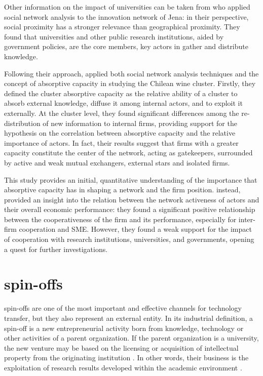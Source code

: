 Other information on the impact of universities can be taken from \citet{Cantner2006} who applied social network analysis to the innovation network of Jena: in their perspective, social proximity has a stronger relevance than geographical proximity. They found that universities and other public research institutions, aided by government policies, are the core members, key actors in gather and distribute knowledge.

Following their approach, \citet{Giuliani2005} applied both social network analysis techniques and the concept of absorptive capacity in studying the Chilean wine cluster. Firstly, they defined the cluster absorptive capacity as the relative ability of a cluster to absorb external knowledge, diffuse it among internal actors, and to exploit it externally. At the cluster level, they found significant differences among the re-distribution of new information to internal firms, providing support for the hypothesis on the correlation between absorptive capacity and the relative importance of actors. In fact, their results suggest that firms with a greater capacity constitute the center of the network, acting as gatekeepers, surrounded by active and weak mutual exchangers, external stars and isolated firms.

This study provides an initial, quantitative understanding of the importance that absorptive capacity has in shaping a network and the firm position. \citet{Zeng2010} instead, provided an insight into the relation between the network activeness of actors and their overall economic performance: they found a significant positive relationship between the cooperativeness of the firm and its performance, especially for inter-firm cooperation and SME. However, they found a weak support for the impact of cooperation with research institutions, universities, and governments, opening a quest for further investigations.


\section{spin-offs}

spin-offs are one of the most important and effective channels for technology transfer, but they also represent an external entity. In its industrial definition, a spin-off is a new entrepreneurial activity born from knowledge, technology or other activities of a parent organization. If the parent organization is a university, the new venture may be based on the licensing or acquisition of intellectual property from the originating institution \citep{Lockett2005a}. In other words, their business is the exploitation of research results developed within the academic environment \citep{Rizzo2015}.

